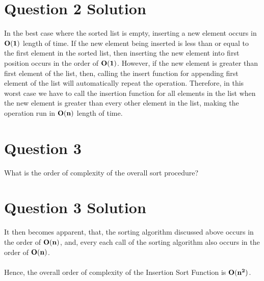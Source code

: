 \documentclass[11pt]{article}
\begin{document}
\section{Question 2 Solution}

In the best case where the sorted list is empty, inserting a new element occurs in $\bf O(1)$ length of time. If the new element being inserted is less than or equal to the first element in the sorted list, then inserting the new element into first position occurs in the order of $\bf O(1)$. However, if the new element is greater than first element of the list, then, calling the insert function for appending first element of the list will automatically repeat the operation. Therefore, in this worst case we have to call the insertion function for all elements in the list when the new element is greater than every other element in the list, making the operation run in $\bf O(n)$ length of time.

\section{Question 3}

What is the order of complexity of the overall sort procedure?

\section{Question 3 Solution}

It then becomes apparent, that, the sorting algorithm discussed above occurs in the order of $\bf O(n)$, and, every each call of the sorting algorithm also occurs in the order of $\bf O(n)$. \\
\\
Hence, the overall order of complexity of the Insertion Sort Function is $\bf O(n^2)$. \\
\end{document}

